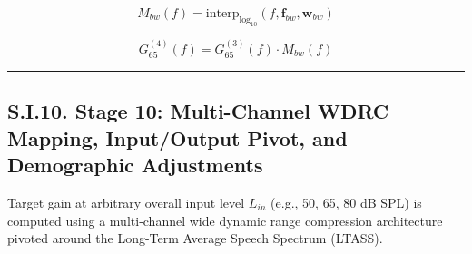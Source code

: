 \documentclass[
  12pt,
]{article}
\begin{document}
\begin{equation}
M_{bw}(f) = \text{interp}_{\log_{10}}\left(f, \mathbf{f}_{bw}, \mathbf{w}_{bw}\right)
\end{equation}

\begin{equation}
G_{65}^{(4)}(f) = G_{65}^{(3)}(f) \cdot M_{bw}(f)
\end{equation}

\begin{center}\rule{0.5\linewidth}{0.5pt}\end{center}

\subsection{S.I.10. Stage 10: Multi-Channel WDRC Mapping, Input/Output
Pivot, and Demographic
Adjustments}\label{s.i.10.-stage-10-multi-channel-wdrc-mapping-inputoutput-pivot-and-demographic-adjustments}

Target gain at arbitrary overall input level \(L_{in}\) (e.g., 50, 65,
80 dB SPL) is computed using a multi-channel wide dynamic range
compression architecture pivoted around the Long-Term Average Speech
Spectrum (LTASS).
\end{document}
